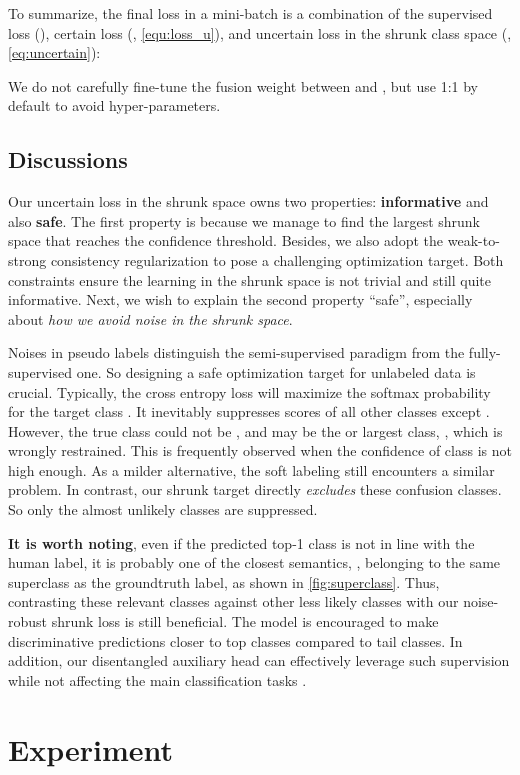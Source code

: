 \documentclass[10pt,twocolumn,letterpaper]{article}
\begin{document}
To summarize, the final loss in a mini-batch is a combination of the supervised loss (), certain loss (, \cref{equ:loss_u}), and uncertain loss in the shrunk class space (, \cref{eq:uncertain}):


We do not carefully fine-tune the fusion weight between  and  , but use 1:1 by default to avoid hyper-parameters.

\subsection{\label{sec:discussion}Discussions}

Our uncertain loss in the shrunk space owns two properties: \textbf{informative} and also \textbf{safe}. The first property is because we manage to find the largest shrunk space that reaches the confidence threshold. Besides, we also adopt the weak-to-strong consistency regularization to pose a challenging optimization target. Both constraints ensure the learning in the shrunk space is not trivial and still quite informative. Next, we wish to explain the second property ``safe'', especially about \emph{how we avoid noise in the shrunk space}.

Noises in pseudo labels distinguish the semi-supervised paradigm from the fully-supervised one. So designing a safe optimization target for unlabeled data is crucial. Typically, the cross entropy loss will maximize the softmax probability  for the target class . It inevitably suppresses scores of all other classes except . However, the true class could not be , and may be the  or  largest class, \etc, which is wrongly restrained. This is frequently observed when the confidence of class  is not high enough. As a milder alternative, the soft labeling still encounters a similar problem. In contrast, our shrunk target directly \emph{excludes} these confusion classes. So only the almost unlikely classes are suppressed. 

\textbf{It is worth noting}, even if the predicted top-1 class is not in line with the human label, it is probably one of the closest semantics, \eg, belonging to the same superclass as the groundtruth label, as shown in \cref{fig:superclass}. Thus, contrasting these relevant classes against other less likely classes with our noise-robust shrunk loss is still beneficial. The model is encouraged to make discriminative predictions closer to top classes compared to tail classes. In addition, our disentangled auxiliary head can effectively leverage such supervision while not affecting the main classification tasks \cite{debiased}. \section{Experiment}
\end{document}
